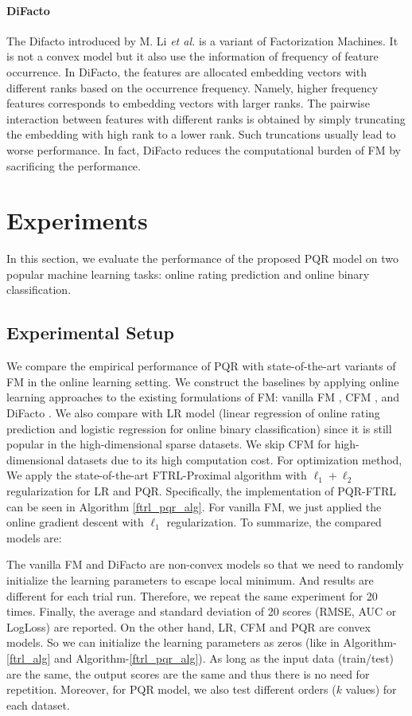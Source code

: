 \documentclass[letterpaper]{article} %
\theoremstyle{plain}
\theoremstyle{definition}
\begin{document}
\paragraph{DiFacto}
The Difacto introduced by M. Li \textit{et al.} \cite{LiDifacto} is a variant of Factorization Machines. It is not a convex model but it also use the information of frequency of feature occurrence. In DiFacto, the features are allocated embedding vectors with different ranks based on the occurrence frequency. Namely, higher frequency features corresponds to embedding vectors with larger ranks. The pairwise interaction between features with different ranks is obtained by simply truncating the embedding with high rank to a lower rank. Such truncations usually lead to worse performance. In fact, DiFacto reduces the computational burden of FM by sacrificing the performance.

\section{Experiments}\label{exp_sec}
In this section, we evaluate the performance of the proposed PQR model on two popular machine learning tasks: online rating prediction and online binary classification.

\subsection{Experimental Setup}
We compare the empirical performance of PQR with state-of-the-art variants of FM in the online learning setting. We construct the baselines by applying online learning approaches to the existing formulations of FM: vanilla FM \cite{RendleICDM}, CFM \cite{YamadaKDD}, and DiFacto \cite{LiDifacto}.
We also compare with LR model (linear regression of online rating prediction and logistic regression for online binary classification) since it is still popular in the high-dimensional sparse datasets. We skip CFM for high-dimensional datasets due to its high computation cost. For optimization method, We apply the state-of-the-art FTRL-Proximal algorithm \cite{McMahanKDD} with $\ell_1+\ell_2$ regularization for LR and PQR. Specifically, the implementation of PQR-FTRL can be seen in Algorithm \ref{ftrl_pqr_alg}. For vanilla FM, we just applied the online gradient descent with $\ell_1$ regularization. To summarize, the compared models are:

The vanilla FM and DiFacto are non-convex models so that we need to randomly initialize the learning parameters to escape local minimum. And results are different for each trial run. Therefore, we repeat the same experiment for 20 times. Finally, the average and standard deviation of 20 scores (RMSE, AUC or LogLoss) are reported. On the other hand, LR, CFM and PQR are convex models. So we can initialize the learning parameters as zeros (like in Algorithm-\ref{ftrl_alg} and Algorithm-\ref{ftrl_pqr_alg}). As long as the input data (train/test) are the same, the output scores are the same and thus there is no need for repetition. Moreover, for PQR model, we also test different orders ($k$ values) for each dataset.
\end{document}
